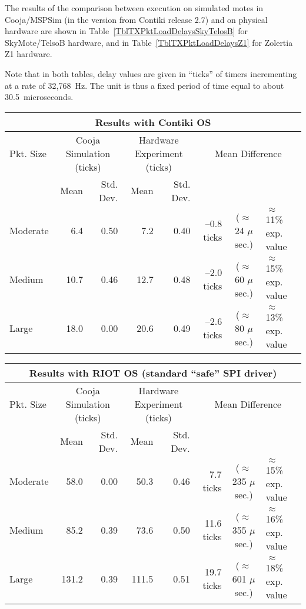 \documentclass[10pt,emptycopyrightspace]{ewsn-proc}
\begin{document}
The results of the comparison between execution on simulated motes
in Cooja/MSPSim (in the version from Contiki release 2.7) and on physical
hardware are shown in Table~\ref{TblTXPktLoadDelaysSkyTelosB} for
SkyMote/TelsoB hardware, and in Table~\ref{TblTXPktLoadDelaysZ1} for
Zolertia Z1 hardware.

Note that in both tables, delay values are given in ``ticks'' of timers
incrementing at a rate of 32,768~Hz. The unit is thus a fixed period of
time equal to about 30.5~microseconds.


\newcommand{\tabtitle}[1]{\multicolumn{8}{c}{\bfseries #1}}
\newcommand{\ticks}[1]{#1 ticks}
\newcommand{\moy}[1]{#1}
\newcommand{\ect}[1]{#1}
\newcommand{\estus}[1]{($\approx$ #1 $\mu$sec.)}
\newcommand{\prctv}[1]{$\approx$ #1\% exp. value}


\begin{table*}[htb]
\caption{Delays Observed for Loading One Packet into CC2420 TX Buffer
of a SkyMote/TelosB Mote, Using Various Software Setups.}
\label{TblTXPktLoadDelaysSkyTelosB}
\centering

\begin{tabular}{l|rr|rr|rcl}
\tabtitle{Results with Contiki OS}\\
\hline
Pkt. Size & \multicolumn{2}{c|}{Cooja Simulation (ticks)}
          & \multicolumn{2}{c|}{Hardware Experiment (ticks)}
          & \multicolumn{3}{c}{Mean Difference} \\
\hline
          & Mean & Std. Dev. & Mean & Std. Dev. & \\
\hline
 Moderate & \moy{6.4} & \ect{0.50} & \moy{7.2} & \ect{0.40}
          & \ticks{--0.8}  & \estus{24} & \prctv{11} \\
 Medium   & \moy{10.7} & \ect{0.46} & \moy{12.7} & \ect{0.48}
          & \ticks{--2.0}  & \estus{60} & \prctv{15} \\
 Large    & \moy{18.0} & \ect{0.00} & \moy{20.6} & \ect{0.49}
          & \ticks{--2.6}  & \estus{80} & \prctv{13} \\
\hline
\end{tabular}

\vspace{4pt}

\begin{tabular}{l|rr|rr|rcl}
\tabtitle{Results with RIOT OS (standard ``safe'' SPI driver)}\\
\hline
Pkt. Size & \multicolumn{2}{c|}{Cooja Simulation (ticks)}
          & \multicolumn{2}{c|}{Hardware Experiment (ticks)}
          & \multicolumn{3}{c}{Mean Difference} \\
\hline
          & Mean & Std. Dev. & Mean & Std. Dev. & \\
\hline
 Moderate & \moy{58.0} & \ect{0.00} & \moy{50.3} & \ect{0.46}
          & \ticks{7.7}  & \estus{235} & \prctv{15} \\
 Medium   & \moy{85.2} & \ect{0.39} & \moy{73.6} & \ect{0.50}
          & \ticks{11.6}  & \estus{355} & \prctv{16} \\
 Large    & \moy{131.2} & \ect{0.39} & \moy{111.5} & \ect{0.51}
          & \ticks{19.7}  & \estus{601} & \prctv{18} \\
\hline
\end{tabular}


\end{table*}
\end{document}

